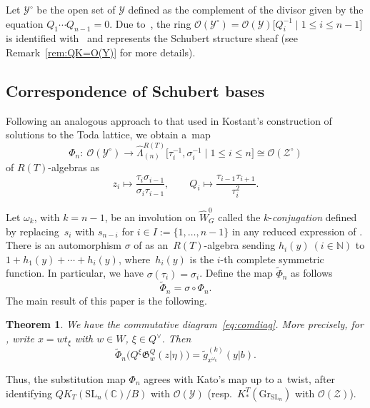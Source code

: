\documentclass[10pt,a4paper]{amsart}
\numberwithin{equation}{section}
\newcommand{\C}{\mathbb{C}}
\newcommand{\Gr}{\mathrm{Gr}}
\newcommand{\Gro}[1]{\mathfrak{G}^Q_{#1}}
\renewcommand{\O}{\mathscr{O}}
\newcommand{\Rep}{{R(T)}}
\newcommand{\SL}{\mathrm{SL}}
\newtheorem{Theorem}{Theorem}[section]
\theoremstyle{definition}
\begin{document}
Let $\mathscr{Y}^\circ$ be the open set of $\mathscr{Y}$ defined as the complement of the divisor given by the equation $Q_1\cdots Q_{n-1}=0$.
Due to~\cite{MNS2}, the ring $\mathscr{O}(\mathscr{Y}^\circ)=\mathscr{O}(\mathscr{Y})\big[Q_i^{-1}\mid 1\leq i\leq n-1\big]$
is identified with~\smash{$QK_T^{\mathrm{pol}}(\SL_n(\C)/B)_Q$}
and  represents the Schubert structure sheaf  (see Remark~\ref{rem:QK=O(Y)} for more details).

\subsection{Correspondence of Schubert bases}
Following an analogous approach to that used in Kostant's construction of solutions to the Toda lattice, we obtain a~map
\[\Phi_n\colon \ \mathscr{O}(\mathscr{Y}^\circ)
\longrightarrow \hat{\Lambda}^{\Rep}_{(n)}\big[\tau_i^{-1},\sigma_i^{-1}\mid 1\leq i\leq n\big]
\cong\mathscr{O}(\mathscr{Z}^\circ)\]
of $\Rep$-algebras as
\begin{equation}
z_i\mapsto \frac{\tau_i\sigma_{i-1}}{\sigma_i \tau_{i-1}},\qquad
Q_i\mapsto \frac{\tau_{i-1}\tau_{i+1}}{\tau_i^2}.\label{eq:Phi}
\end{equation}

Let $\omega_k$, with $k=n-1$, be an involution on $\hat{W}_G^0$ called the $k$-\emph{conjugation} defined by replacing~$s_i$ with $s_{n-i}$ for $i \in I:=\{1,\dots,n-1\}$ in any reduced expression of .
There is an automorphism $\sigma$ of \smash{$\hat{\Lambda}^{\Rep}_{(n)}$} as an~$\Rep$-algebra
sending $h_i(y)\ (i\in\mathbb{N})$ to $1+h_1(y)+\cdots+h_i(y)$, where~$h_i(y)$ is the
$i$-th complete symmetric function.
In particular, we have $\sigma(\tau_i)=\sigma_i$.
Define the map $\tilde{\Phi}_n$ as follows
\begin{equation}
\label{eq:tPhi}
\tilde{\Phi}_n=\sigma \circ \Phi_n.
\end{equation}
The main result of this paper is the following.

\begin{Theorem}\label{thm:main}
We have the commutative diagram~\eqref{eq:comdiag}. More precisely,
for , write $x=wt_\xi$ with $w\in W$, $\xi\in Q^\vee$. Then
\[
\tilde{\Phi}_n\bigl(
Q^\xi \Gro{w}(z| \eta)\bigr)=
\tilde{g}_{x^{\omega_k}}^{(k)}(y|b).
\]
\end{Theorem}

Thus, the substitution map ${\Phi}_n$ agrees with Kato's map up to a~twist, after identifying
 $QK_T(\SL_n(\C)/B)$ with $\mathscr{O}(\mathscr{Y})$ \big(resp.\ $K_*^T(\Gr_{\SL_n})$ with $\O(\mathscr{Z})$\big).
\end{document}

